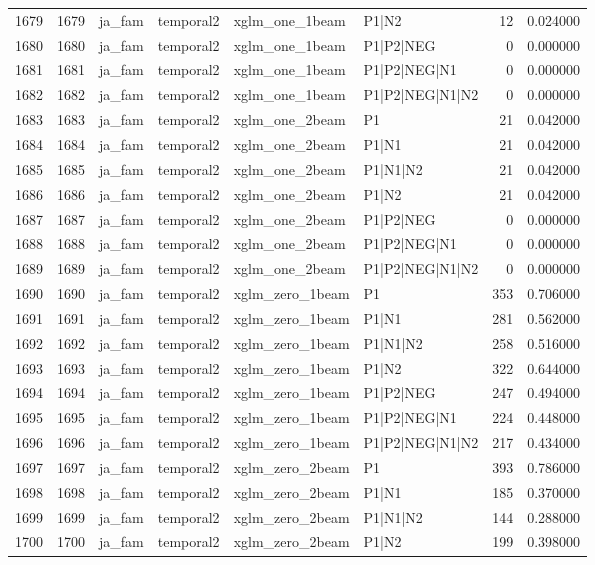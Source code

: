 \begin{tabular}{lrllllrr}
1679 & 1679 & ja_fam & temporal2 & xglm_one_1beam & P1|N2 & 12 & 0.024000 \\
1680 & 1680 & ja_fam & temporal2 & xglm_one_1beam & P1|P2|NEG & 0 & 0.000000 \\
1681 & 1681 & ja_fam & temporal2 & xglm_one_1beam & P1|P2|NEG|N1 & 0 & 0.000000 \\
1682 & 1682 & ja_fam & temporal2 & xglm_one_1beam & P1|P2|NEG|N1|N2 & 0 & 0.000000 \\
1683 & 1683 & ja_fam & temporal2 & xglm_one_2beam & P1 & 21 & 0.042000 \\
1684 & 1684 & ja_fam & temporal2 & xglm_one_2beam & P1|N1 & 21 & 0.042000 \\
1685 & 1685 & ja_fam & temporal2 & xglm_one_2beam & P1|N1|N2 & 21 & 0.042000 \\
1686 & 1686 & ja_fam & temporal2 & xglm_one_2beam & P1|N2 & 21 & 0.042000 \\
1687 & 1687 & ja_fam & temporal2 & xglm_one_2beam & P1|P2|NEG & 0 & 0.000000 \\
1688 & 1688 & ja_fam & temporal2 & xglm_one_2beam & P1|P2|NEG|N1 & 0 & 0.000000 \\
1689 & 1689 & ja_fam & temporal2 & xglm_one_2beam & P1|P2|NEG|N1|N2 & 0 & 0.000000 \\
1690 & 1690 & ja_fam & temporal2 & xglm_zero_1beam & P1 & 353 & 0.706000 \\
1691 & 1691 & ja_fam & temporal2 & xglm_zero_1beam & P1|N1 & 281 & 0.562000 \\
1692 & 1692 & ja_fam & temporal2 & xglm_zero_1beam & P1|N1|N2 & 258 & 0.516000 \\
1693 & 1693 & ja_fam & temporal2 & xglm_zero_1beam & P1|N2 & 322 & 0.644000 \\
1694 & 1694 & ja_fam & temporal2 & xglm_zero_1beam & P1|P2|NEG & 247 & 0.494000 \\
1695 & 1695 & ja_fam & temporal2 & xglm_zero_1beam & P1|P2|NEG|N1 & 224 & 0.448000 \\
1696 & 1696 & ja_fam & temporal2 & xglm_zero_1beam & P1|P2|NEG|N1|N2 & 217 & 0.434000 \\
1697 & 1697 & ja_fam & temporal2 & xglm_zero_2beam & P1 & 393 & 0.786000 \\
1698 & 1698 & ja_fam & temporal2 & xglm_zero_2beam & P1|N1 & 185 & 0.370000 \\
1699 & 1699 & ja_fam & temporal2 & xglm_zero_2beam & P1|N1|N2 & 144 & 0.288000 \\
1700 & 1700 & ja_fam & temporal2 & xglm_zero_2beam & P1|N2 & 199 & 0.398000 \\

\end{tabular}
